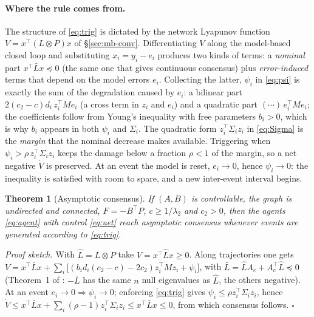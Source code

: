 \documentclass[11pt,a4paper]{article}
\newtheorem{theorem}{Theorem}
\theoremstyle{remark}
\newcommand{\kron}{\otimes}
\newcommand{\T}{^{\top}}
\begin{document}
\paragraph{Where the rule comes from.} The structure of \eqref{eq:trig} is dictated by the network
Lyapunov function $V=x\T(L\kron P)x$ of \S\ref{sec:mb-conv}. Differentiating $V$ along the
model-based closed loop and substituting $x_i=y_i-e_i$ produces two kinds of terms: a
\emph{nominal} part $x\T\bar L x\preceq 0$ (the same one that gives continuous consensus) plus
\emph{error-induced} terms that depend on the model errors $e_i$. Collecting the latter,
$\psi_i$ in \eqref{eq:psi} is exactly the sum of the degradation caused by $e_i$: a bilinear part
$2(c_2-c)d_i\,z_i\T M e_i$ (a cross term in $z_i$ and $e_i$) and a quadratic part $(\cdots)\,e_i\T M e_i$;
the coefficients follow from Young's inequality with free parameters $b_i>0$, which is why $b_i$
appears in both $\psi_i$ and $\Sigma_i$. The quadratic form $z_i\T\Sigma_i z_i$ in \eqref{eq:Sigma}
is the \emph{margin} that the nominal decrease makes available. Triggering when
$\psi_i>\rho\,z_i\T\Sigma_i z_i$ keeps the damage below a fraction $\rho<1$ of the margin, so a net
negative $\dot V$ is preserved. At an event the model is reset, $e_i\to 0$, hence $\psi_i\to 0$: the
inequality is satisfied with room to spare, and a new inter-event interval begins.

\begin{theorem}[Asymptotic consensus]
If $(A,B)$ is controllable, the graph is undirected and connected, $F=-B\T P$, $c\ge1/\lambda_2$
and $c_2>0$, then the agents \eqref{eq:agent} with control \eqref{eq:uet} reach asymptotic
consensus whenever events are generated according to \eqref{eq:trig}.
\end{theorem}

\emph{Proof sketch.} With $\hat L = L\kron P$ take $V = x\T\hat L x\ge 0$. Along trajectories one
gets $\dot V = x\T\bar L x + \sum_i\!\big[(b_id_i(c_2-c)-2c_2)z_i\T M z_i + \psi_i\big]$, with
$\bar L = \hat L A_c + A_c\T\hat L \preceq 0$ (Theorem~1 of \cite{garcia2014}: $-\bar L$ has the
same $n$ null eigenvalues as $\hat L$, the others negative). At an event
$e_i\!\to\!0\Rightarrow\psi_i\!\to\!0$; enforcing \eqref{eq:trig} gives
$\psi_i\le\rho z_i\T\Sigma_i z_i$, hence
$\dot V \le x\T\bar L x + \sum_i(\rho-1)z_i\T\Sigma_i z_i \le x\T\bar L x \le 0$, from which
consensus follows. \hfill$\square$
\end{document}
